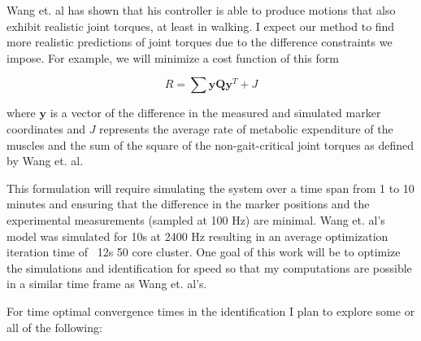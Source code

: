 \documentclass[11pt,twocolumn]{article}
\begin{document}
Wang et. al has shown that his controller is able to produce motions that also
exhibit realistic joint torques, at least in walking. I expect our method to
find more realistic predictions of joint torques due to the difference
constraints we impose. For example, we will minimize a cost function of this form

\begin{equation}
  R = \sum \mathbf{y}\mathbf{Q}\mathbf{y}^T + J
\end{equation}

where $\mathbf{y}$ is a vector of the difference in the measured and simulated
marker coordinates and $J$ represents the average rate of metabolic expenditure
of the muscles and the sum of the square of the non-gait-critical joint torques
as defined by Wang et. al.

This formulation will require simulating the system over a time span from 1 to
10 minutes and ensuring that the difference in the marker positions and the
experimental measurements (sampled at 100 Hz) are minimal. Wang et. al's model
was simulated for 10s at 2400 Hz resulting in an average optimization iteration
time of ~12s 50 core cluster. One goal of this work will be to optimize the
simulations and identification for speed so that my computations are possible
in a similar time frame as Wang et. al's.

For time optimal convergence times in the identification I plan to explore some
or all of the following:
\end{document}
